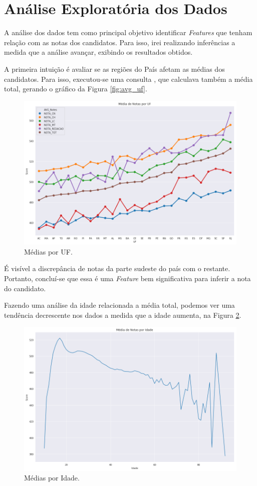 \documentclass{article}
\begin{document}
\newpage
\section{Análise Exploratória dos Dados}

A análise dos dados tem como principal objetivo identificar \emph{Features} que tenham relação com as notas dos candidatos. Para isso, irei realizando inferências a medida que a análise avançar, exibindo os resultados obtidos.

A primeira intuição é avaliar se as regiões do País afetam as médias dos candidatos. Para isso, executou-se uma consulta , que calculava também a média total, gerando o gráfico da Figura \ref{fig:avg_uf}.

\begin{figure}[H]
\centering
  \includegraphics[width= 0.8 \linewidth]{img/mean_by_uf.png}
  \caption{Médias por UF.}
  \label{fig:fig_maq_criad}
\end{figure}

É visível a discrepância de notas da parte sudeste do país com o restante. Portanto, concluí-se que essa é uma \emph{Feature} bem significativa para inferir a nota do candidato.

Fazendo uma análise da idade relacionada a média total, podemos ver uma tendência decrescente nos dados a medida que a idade aumenta, na Figura \ref{fig:mean_by_age}. 

\begin{figure}[H]
\centering
  \includegraphics[width=0.8 \linewidth]{img/mean_by_age.png}
  \caption{Médias por Idade.}
  \label{fig:mean_by_age}
\end{figure}
\end{document}
